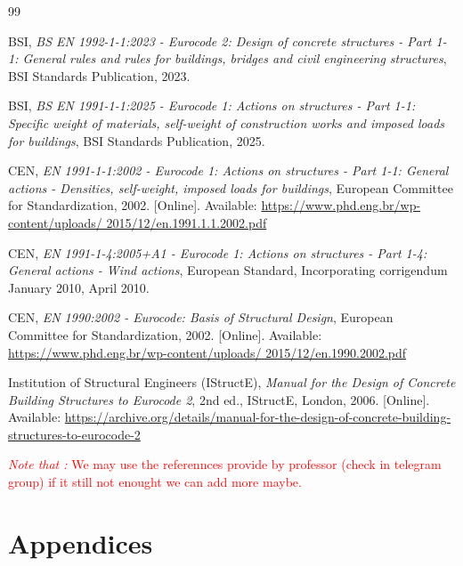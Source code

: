 \documentclass[12pt,twoside,a4paper,openany]{report}
\begin{document}
\begin{thebibliography}{99}

BSI, \textit{BS EN 1992-1-1:2023 - Eurocode 2:
Design of concrete structures - Part 1-1:
General rules and rules for buildings, bridges
and civil engineering structures},
BSI Standards Publication, 2023.

BSI, \textit{BS EN 1991-1-1:2025 - Eurocode 1:
Actions on structures - Part 1-1: Specific weight
of materials, self-weight of construction works
and imposed loads for buildings},
BSI Standards Publication, 2025.

CEN, \textit{EN 1991-1-1:2002 - Eurocode 1:
Actions on structures - Part 1-1: General actions
- Densities, self-weight, imposed loads for
buildings}, European Committee for
Standardization, 2002.
[Online]. Available:
\url{https://www.phd.eng.br/wp-content/uploads/
2015/12/en.1991.1.1.2002.pdf}

CEN, \textit{EN 1991-1-4:2005+A1 - Eurocode 1:
Actions on structures - Part 1-4: General actions
- Wind actions}, European Standard, Incorporating
corrigendum January 2010, April 2010.

CEN, \textit{EN 1990:2002 - Eurocode:
Basis of Structural Design},
European Committee for Standardization, 2002.
[Online]. Available:
\url{https://www.phd.eng.br/wp-content/uploads/
2015/12/en.1990.2002.pdf}

Institution of Structural Engineers (IStructE),
\textit{Manual for the Design of Concrete Building
Structures to Eurocode 2},
2nd ed., IStructE, London, 2006.
[Online]. Available:
\url{https://archive.org/details/manual-for-the-design-of-concrete-building-
structures-to-eurocode-2}

\end{thebibliography}

\noindent \textcolor{red}{\textit{Note that :} We may use the referennces provide by professor (check in telegram group) if it still not enought we can add more maybe.}

\clearpage
{} %
\section*{Appendices}


\end{document}
